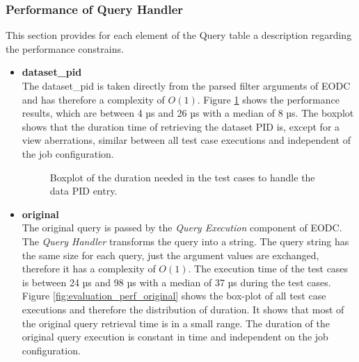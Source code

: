 \documentclass[draft,final]{vutinfth} %
\begin{document}
\subsubsection{Performance of Query Handler}\label{Evaluation:impact_perf_query}
This section provides for each element of the Query table a description regarding the performance constrains.
\begin{itemize}
	\item \textbf{dataset\_pid} \\
	The dataset\_pid is taken directly from the parsed filter arguments of EODC and has therefore a complexity of $O(1)$. Figure \ref{fig:evaluation_perf_datapid} shows the performance results, which are between 4 µs and 26 µs with a median of 8 µs. The boxplot shows that the duration time of retrieving the dataset PID is, except for a view aberrations, similar between all test case executions and independent of the job configuration.    
	\begin{figure}[!h]
		\centering
		\caption{Boxplot of the duration needed in the test cases to handle the data PID entry. }
		\label{fig:evaluation_perf_datapid}
	\end{figure}
	\item \textbf{original} \\
	The original query is passed by the \textit{Query Execution} component of EODC. The \textit{Query Handler} transforms the query into a string. The query string has the same size for each query, just the argument values are exchanged, therefore it has a complexity of $O(1)$. The execution time of the test cases is between 24 µs and 98 µs with a median of 37 µs during the test cases. Figure \ref{fig:evaluation_perf_original} shows the box-plot of all test case executions and therefore the distribution of duration. It shows that most of the original query retrieval time is in a small range. The duration of the original query execution is constant in time and independent on the job configuration. 
	\begin{figure}[!h]

\end{figure}
\end{itemize}
\end{document}
